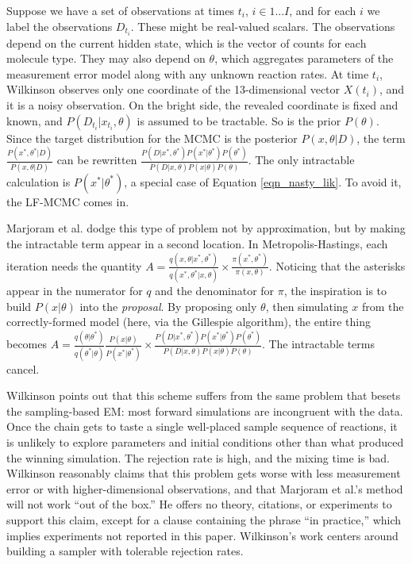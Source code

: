 \documentclass{article}
\begin{document}
Suppose we have a set of observations at times $t_i$, $i \in 1...I$, and for each $i$ we label the observations $D_{t_i}$. These might be real-valued scalars. The observations depend on the current hidden state, which is the vector of counts for each molecule type. They may also depend on $\theta$, which aggregates parameters of the measurement error model along with any unknown reaction rates. At time $t_i$, Wilkinson observes only one coordinate of the 13-dimensional vector $X(t_i)$, and it is a noisy observation. On the bright side, the revealed coordinate is fixed and known, and $P(D_{t_{i}}|x_{t_i}, \theta)$ is assumed to be tractable. So is the prior $P(\theta)$. Since the target distribution for the MCMC is the posterior $P(x, \theta|D)$, the term $\frac{P(x^*, \theta^*|D)}{P(x, \theta|D)}$ can be rewritten $\frac{P(D|x^*, \theta^*)P(x^*|\theta^*)P(\theta^*)}{P(D|x, \theta)P(x| \theta)P(\theta)}$. The only intractable calculation is $P(x^*|\theta^*)$, a special case of Equation \ref{eqn_nasty_lik}. To avoid it, the LF-MCMC comes in.

Marjoram et al. dodge this type of problem not by approximation, but by making the intractable term appear in a second location. In Metropolis-Hastings, each iteration needs the quantity $A=\frac{q(x, \theta|x^*, \theta^*)}{q(x^*, \theta^*|x, \theta)} \times \frac{\pi(x^*, \theta^*)}{\pi(x, \theta)}$. Noticing that the asterisks appear in the numerator for $q$ and the denominator for $\pi$, the inspiration is to build $P(x| \theta)$ into the {\it proposal}. By proposing only $\theta$, then simulating $x$ from the correctly-formed model (here, via the Gillespie algorithm), the entire thing becomes $A=\frac{q(\theta|\theta^*)}{q(\theta^*|\theta)} \frac{P(x|\theta)}{P(x^*|\theta^*)} \times \frac{P(D|x^*, \theta^*)P(x^*|\theta^*)P(\theta^*)}{P(D|x, \theta)P(x| \theta)P(\theta)}$. The intractable terms cancel.

Wilkinson points out that this scheme suffers from the same problem that besets the sampling-based EM: most forward simulations are incongruent with the data. Once the chain gets to taste a single well-placed sample sequence of reactions, it is unlikely to explore parameters and initial conditions other than what produced the winning simulation. The rejection rate is high, and the mixing time is bad. Wilkinson reasonably claims that this problem gets worse with less measurement error or with higher-dimensional observations, and that Marjoram et al.'s method will not work ``out of the box.'' He offers no theory, citations, or experiments to support this claim, except for a clause containing the phrase ``in practice,'' which implies experiments not reported in this paper. Wilkinson's work centers around building a sampler with tolerable rejection rates. 
\end{document}
